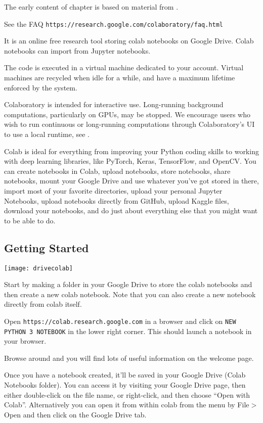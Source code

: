 The early content of chapter is based on material from  \cite{LiuCoLab2019,AnneBonner2019}.

See the FAQ
\lstinline{https://research.google.com/colaboratory/faq.html}

It is an online  free research tool storing colab notebooks on Google Drive. Colab notebooks can import from Jupyter notebooks.

The code is executed in a virtual machine dedicated to your account. Virtual machines are recycled when idle for a while, and have a maximum lifetime enforced by the system. 

Colaboratory is intended for interactive use. Long-running background computations, particularly on GPUs, may be stopped. We encourage users who wish to run continuous or long-running computations through Colaboratory's UI to use a local runtime, see \cite{googleLcalColabs2019}.

Colab is ideal for everything from improving your Python coding skills to working with deep learning libraries, like PyTorch, Keras, TensorFlow, and OpenCV. You can create notebooks in Colab, upload notebooks, store notebooks, share notebooks, mount your Google Drive and use whatever you've got stored in there, import most of your favorite directories, upload your personal Jupyter Notebooks, upload notebooks directly from GitHub, upload Kaggle files, download your notebooks, and do just about everything else that you might want to be able to do.

\subsection{Getting Started}
\begin{marginfigure}
\texttt{[image: drivecolab]}
\end{marginfigure}
Start by making a folder in your Google Drive to store the colab notebooks and then create a new colab notebook. Note that you can also create a new notebook directly from colab itself.

Open \lstinline{https://colab.research.google.com} in a browser and click on \lstinline{NEW PYTHON 3 NOTEBOOK} in the lower right corner.  This should launch a notebook in your browser. 

Browse around and you will find lots of useful information on the welcome page.

Once you have a notebook created, it'll be saved in your Google Drive (Colab Notebooks folder). You can access it by visiting your Google Drive page, then either double-click on the file name, or right-click, and then choose ``Open with Colab''.  Alternatively you can open it from within colab from the menu by File$>$Open and then click on the Google Drive tab.

